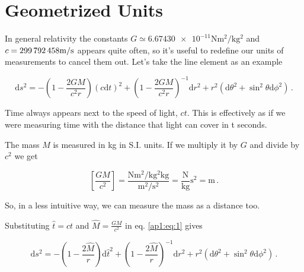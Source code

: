 
\chapter{Geometrized Units} \label{ap:geometrized_units}

In general relativity the constants $G \simeq \num{6.67430e-11}
\unit{\newton\meter\squared\per\kilo\gram\squared}$ and 
$c = \num{299792458} \unit[per-mode = symbol]{\meter\per\second}$ appears quite
often, so it's useful to redefine our units of measurements to cancel them out.
Let's take the \Sh line element as an example

\begin{equation}
    \mathrm{d}s^2 = - \left(1 - \frac{2 G M}{c^2 r} \right) (c \mathrm{d}t)^2
    + \left(1 - \frac{2 G M}{c^2 r} \right)^{-1} \mathrm{d}r^2
    + r^2 (\mathrm{d}\theta^2 + \sin^2 \theta \mathrm{d}\phi^2)
    \, .
    \label{ap1:eq:1}
\end{equation}

Time always appears next to the speed of light, $ct$. This is effectively as if
we were measuring time with the distance that light can cover in t seconds.
%

The mass $M$ is measured in \unit{\kilogram} in S.I. units.
If we multiply it by $G$ and divide by $c^2$ we get 

\begin{equation*}
    \left[\frac{GM}{c^2} \right] =
    \frac{\unit{\newton\meter\squared\per\kilo\gram\squared\kilo\gram}}
    {\unit{\meter\squared\per\second\squared}} = 
    \frac{\unit{\newton}}{\unit{\kilogram}} \unit{\second\squared}=
    \unit{\meter} \, .
\end{equation*}

So, in a less intuitive way, we can measure the mass as a distance too.

Substituting $\hat t = ct$ and $\hat M = \frac{GM}{c^2}$ in eq. \ref{ap1:eq:1}
gives


\begin{equation*}
    \mathrm{d}s^2 = - \left(1 - \frac{2 \hat M}{r} \right) \mathrm{d} \hat t^2
    + \left(1 - \frac{2 \hat M}{r} \right)^{-1} \mathrm{d}r^2
    + r^2 (\mathrm{d}\theta^2 + \sin^2 \theta \mathrm{d}\phi^2)
    \, .
\end{equation*}

